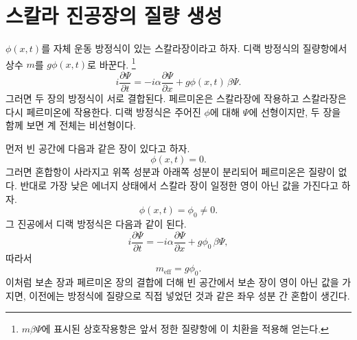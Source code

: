 \section{스칼라 진공장의 질량 생성}

\begin{classroomqa}
\end{classroomqa}

\(\phi(x,t)\)를 자체 운동 방정식이 있는 스칼라장이라고 하자. 디랙 방정식의 질량항에서 상수 \(m\)를 \(g\phi(x,t)\)로 바꾼다.
\footnote{\(m\beta\Psi\)에 표시된 상호작용항은 앞서 정한 질량항에 이 치환을 적용해 얻는다.}
\begin{equation}
i\frac{\partial\Psi}{\partial t}
=
-i\alpha\frac{\partial\Psi}{\partial x}
+g\phi(x,t)\,\beta\Psi.
\end{equation}
그러면 두 장의 방정식이 서로 결합된다. 페르미온은 스칼라장에 작용하고 스칼라장은 다시 페르미온에 작용한다. 디랙 방정식은 주어진 \(\phi\)에 대해 \(\Psi\)에 선형이지만, 두 장을 함께 보면 계 전체는 비선형이다.

먼저 빈 공간에 다음과 같은 장이 있다고 하자.
\begin{equation}
\phi(x,t)=0.
\end{equation}
그러면 혼합항이 사라지고 위쪽 성분과 아래쪽 성분이 분리되어 페르미온은 질량이 없다. 반대로 가장 낮은 에너지 상태에서 스칼라 장이 일정한 영이 아닌 값을 가진다고 하자.
\begin{equation}
\phi(x,t)=\phi_0\neq0.
\end{equation}
그 진공에서 디랙 방정식은 다음과 같이 된다.
\begin{equation}
i\frac{\partial\Psi}{\partial t}
=
-i\alpha\frac{\partial\Psi}{\partial x}
+g\phi_0\,\beta\Psi,
\end{equation}
따라서
\begin{equation}
m_{\mathrm{eff}}=g\phi_0.
\end{equation}
이처럼 보손 장과 페르미온 장의 결합에 더해 빈 공간에서 보손 장이 영이 아닌 값을 가지면, 이전에는 방정식에 질량으로 직접 넣었던 것과 같은 좌우 성분 간 혼합이 생긴다.

\begin{classroomqa}
\end{classroomqa}

